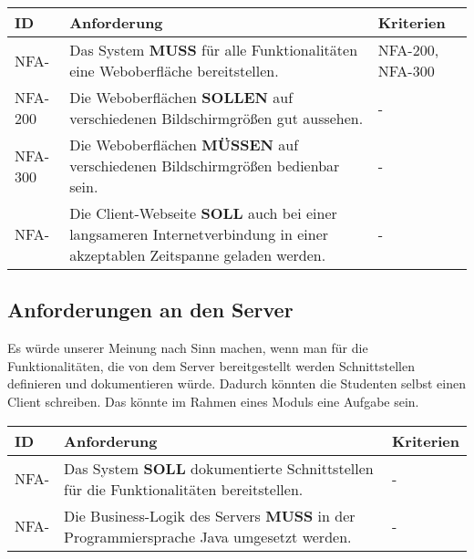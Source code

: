 \vspace{12pt}

\begin{tabular} {|p{}|p{11cm}|p{}|}
	\hline
	ID & Anforderung & Kriterien \\
	\hline
	NFA-
	& Das System \textbf{MUSS} für alle Funktionalitäten eine Weboberfläche bereitstellen. 
	& NFA-200, NFA-300 \\
	\hline
	NFA-200 
	& Die Weboberflächen \textbf{SOLLEN} auf verschiedenen Bildschirmgrößen gut aussehen.
	& -  \\
	\hline
	NFA-300
	& Die Weboberflächen \textbf{MÜSSEN} auf verschiedenen Bildschirmgrößen bedienbar sein.
	& - \\
	\hline
	NFA-
	& Die Client-Webseite \textbf{SOLL} auch bei einer langsameren Internetverbindung in einer akzeptablen Zeitspanne geladen werden.
	& - \\
	\hline
\end{tabular}

\newpage

\subsection{Anforderungen an den Server}
Es würde unserer Meinung nach Sinn machen, wenn man für die Funktionalitäten, die von dem Server bereitgestellt werden Schnittstellen definieren und dokumentieren würde. Dadurch könnten die Studenten selbst einen Client schreiben. Das könnte im Rahmen eines Moduls eine Aufgabe sein. 

\vspace{12pt}

\begin{tabular} {|p{}|p{11cm}|p{}|}
	\hline
	ID & Anforderung & Kriterien \\
	\hline
	NFA- 
	& Das System \textbf{SOLL} dokumentierte Schnittstellen für die Funktionalitäten bereitstellen.
	& - \\
	\hline
	NFA- 
	& Die Business-Logik des Servers \textbf{MUSS} in der Programmiersprache Java umgesetzt werden.
	& - \\
	\hline
\end{tabular}